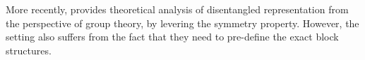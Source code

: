 More recently, \cite{cohen2014learning} provides theoretical analysis of disentangled representation from the perspective of group theory, by levering the symmetry property. However, the setting also suffers from the fact that they need to pre-define the exact block structures. 












